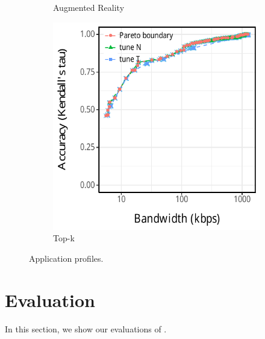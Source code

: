 \begin{figure}[htb]
\begin{subfigure}[t]{0.33\textwidth}
    \caption{Augmented Reality}
    \label{fig:ar-profile}
  \end{subfigure}
  \hfill
  \begin{subfigure}[t]{0.33\textwidth}
    \centering
    \includegraphics[width=\textwidth]{figures/profile-topk.pdf}
    \caption{Top-k}
    \label{fig:tk-profile}
  \end{subfigure}
  \caption{Application profiles.}
  \label{fig:all-profiles}
\end{figure}

\section{Evaluation}
\label{sec:evaluation}

In this section, we show our evaluations of \sysname{}.

